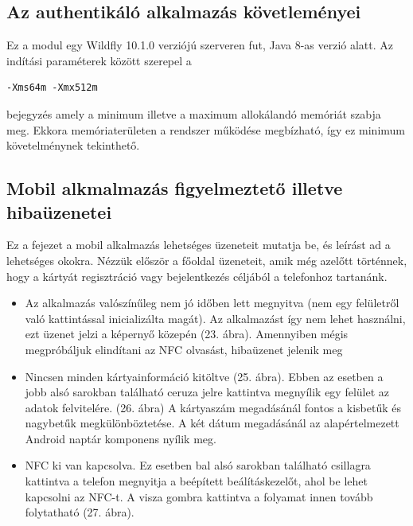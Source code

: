 \subsection{Az authentikáló alkalmazás követleményei}

Ez a modul egy Wildfly 10.1.0 verziójú szerveren fut, Java 8-as verzió alatt. Az indítási paraméterek között szerepel a
\begin{verbatim}
-Xms64m -Xmx512m 
\end{verbatim}
bejegyzés amely a minimum illetve a maximum allokálandó memóriát szabja meg. Ekkora memóriaterületen a rendszer működése megbízható, így ez minimum követelménynek tekinthető.


\subsection{Mobil alkmalmazás figyelmeztető illetve hibaüzenetei}
Ez a fejezet a mobil alkalmazás lehetséges üzeneteit mutatja be, és leírást ad a lehetséges okokra. Nézzük először a főoldal üzeneteit, amik még azelőtt történnek, hogy a kártyát regisztráció vagy bejelentkezés céljából a telefonhoz tartanánk.
\begin{itemize}
\item Az alkalmazás valószínűleg nem jó időben lett megnyitva (nem egy felületről való kattintással inicializálta magát). Az alkalmazást így nem lehet használni, ezt üzenet jelzi a képernyő közepén (23. ábra). Amennyiben mégis megpróbáljuk elindítani az NFC olvasást, hibaüzenet jelenik meg
\item Nincsen minden kártyainformáció kitöltve (25. ábra). Ebben az esetben a jobb alsó sarokban található ceruza jelre kattintva megnyílik egy felület az adatok felvitelére. (26. ábra)
A kártyaszám megadásánál fontos a kisbetűk és nagybetűk megkülönböztetése. A két dátum megadásánál az alapértelmezett Android naptár komponens nyílik meg.
\item NFC ki van kapcsolva. Ez esetben bal alsó sarokban található csillagra kattintva a telefon megnyitja a beépített beálításkezelőt, ahol be lehet kapcsolni az NFC-t. A visza gombra kattintva a folyamat innen tovább folytatható (27. ábra).
\end{itemize}

